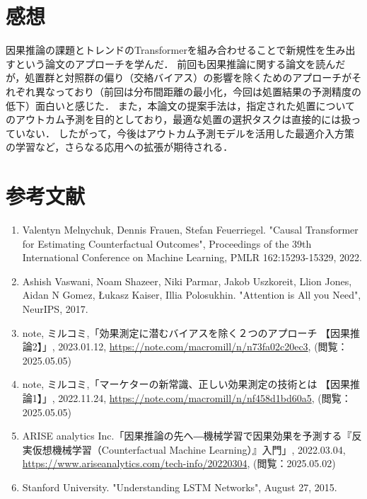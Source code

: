 \documentclass[dvipdfmx]{jreport}
\begin{document}
\section{感想}
因果推論の課題とトレンドのTransformerを組み合わせることで新規性を生み出すという論文のアプローチを学んだ．
前回も因果推論に関する論文を読んだが，処置群と対照群の偏り（交絡バイアス）の影響を除くためのアプローチがそれぞれ異なっており（前回は分布間距離の最小化，今回は処置結果の予測精度の低下）面白いと感じた．
また，本論文の提案手法は，指定された処置についてのアウトカム予測を目的としており，最適な処置の選択タスクは直接的には扱っていない．
したがって，今後はアウトカム予測モデルを活用した最適介入方策の学習など，さらなる応用への拡張が期待される．


\section{参考文献}
\begin{enumerate}
    \renewcommand{\labelenumi}{[\theenumi]}
    \item \label{ref:元論}Valentyn Melnychuk, Dennis Frauen, Stefan Feuerriegel. "Causal Transformer for Estimating Counterfactual Outcomes", Proceedings of the 39th International Conference on Machine Learning, PMLR 162:15293-15329, 2022. 
    \item \label{ref:trans}Ashish Vaswani, Noam Shazeer, Niki Parmar, Jakob Uszkoreit, Llion Jones, Aidan N Gomez, Łukasz Kaiser, Illia Polosukhin. "Attention is All you Need", NeurIPS, 2017.
    \item \label{ref:交絡}note, ミルコミ,「効果測定に潜むバイアスを除く２つのアプローチ 【因果推論2】」, 2023.01.12, \url{https://note.com/macromill/n/n73fa02c20ec3}, (閲覧：2025.05.05)
    \item \label{ref:rct}note, ミルコミ,「マーケターの新常識、正しい効果測定の技術とは 【因果推論1】」, 2022.11.24, \url{https://note.com/macromill/n/nf458d1bd60a5}, (閲覧：2025.05.05)
    \item \label{ref:counterfactual}ARISE analytics Inc.「因果推論の先へ―機械学習で因果効果を予測する『反実仮想機械学習（Counterfactual Machine Learning）』入門」, 2022.03.04, \url{https://www.ariseanalytics.com/tech-info/20220304}, (閲覧：2025.05.02)
    \item \label{ref:lstm}Stanford University. "Understanding LSTM Networks", August 27, 2015.
\end{enumerate}
\end{document}
